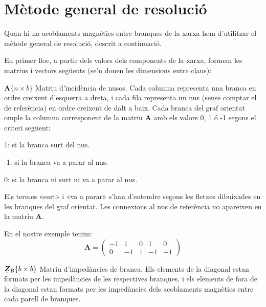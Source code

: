 \section{Mètode general de resolució}

Quan hi ha acoblaments
magnètics entre branques de la xarxa hem d'utilitzar el mètode
general de resolució, descrit a continuació.

En primer lloc, a partir dels valors dels components de la xarxa, formem les matrius i vectors següents (se'n donen les  dimensions entre claus):
\begin{list}{}
{\setlength{\labelwidth}{20mm} \setlength{\leftmargin}{22mm} \setlength{\labelsep}{2mm}}
   \item[$\boldsymbol{A}\{n\times b\}$] Matriu d'incidència de nusos. Cada columna representa una branca en ordre creixent d'esquerra a dreta, i cada fila representa un nus (sense comptar el de referència) en ordre creixent de dalt a baix. Cada branca del graf orientat omple la columna corresponent de la matriu $\boldsymbol{A}$ amb els valors 0, 1 ó -1 segons el criteri següent:
   \begin{list}{}
   {\setlength{\labelwidth}{7mm} \setlength{\leftmargin}{9mm} \setlength{\labelsep}{2mm}}
      \item[1:]  si la branca surt del nus.
      \item[-1:] si la branca va a parar al nus.
      \item[0:]  si la branca ni surt ni va a parar al nus.
   \end{list}
   Els termes «surt» i «va a parar» s'han d'entendre segons les fletxes dibuixades en les branques del graf orientat. Les connexions al nus de referència no apareixen en la matriu $\boldsymbol{A}$.

   En el nostre exemple tenim:
   \[
      \boldsymbol{A} = \left(\begin{array}{rrrrr} -1 & 1  & 0 &  1 & 0 \\  0 & -1 & 1 & -1 & -1
                   \end{array} \right)
   \]

   \item[$\mcmplx{Z}\ped{B}\{b\times b\}$] Matriu d'impedàncies de branca. Els elements de la diagonal estan formats per les impedàncies de les respectives branques, i els elements de fora de la diagonal estan formats per les impedàncies dels acoblaments magnètics entre cada parell de branques.


\end{list}
